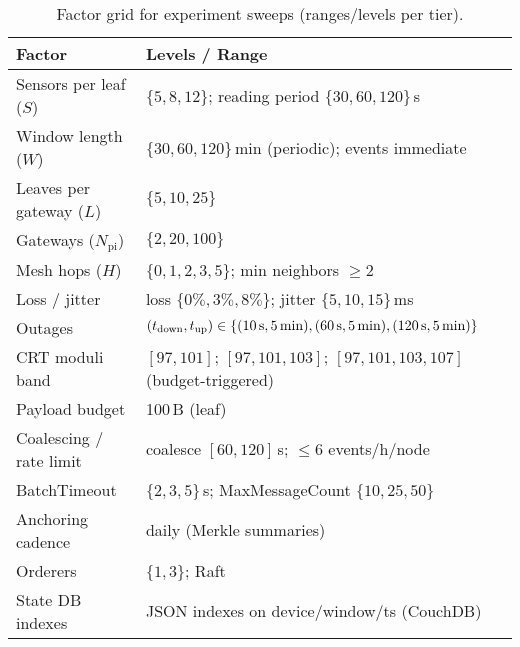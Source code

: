 \documentclass[12pt,onecolumn]{IEEEtran} %
\begin{document}
\begin{table}[htbp]
  \centering
  \caption{Factor grid for experiment sweeps (ranges/levels per tier).}
  \label{tab:factor-grid}
  \begin{tabular}{p{3.2cm} p{10.8cm}}
    \toprule
    \textbf{Factor} & \textbf{Levels / Range} \\
    \midrule
    Sensors per leaf ($S$) & $\{5,8,12\}$; reading period $\{30,60,120\}$\,s \\
    Window length ($W$) & $\{30,60,120\}$\,min (periodic); events immediate \\
    Leaves per gateway ($L$) & $\{5,10,25\}$ \\
    Gateways ($N_{\text{pi}}$) & $\{2,20,100\}$ \\
    Mesh hops ($H$) & $\{0,1,2,3,5\}$; min neighbors $\geq 2$ \\
    Loss / jitter & loss $\{0\%,3\%,8\%\}$; jitter $\{5,10,15\}$\,ms \\
    Outages & $(t_{\text{down}},t_{\text{up}})\in\{(10\text{\,s},5\text{\,min}),(60\text{\,s},5\text{\,min}),(120\text{\,s},5\text{\,min})\}$ \\
    CRT moduli band & $[97,101]$; $[97,101,103]$; $[97,101,103,107]$ (budget-triggered) \\
    Payload budget & 100\,B (leaf) \\
    Coalescing / rate limit & coalesce $[60,120]$\,s; $\leq6$ events/h/node \\
    BatchTimeout & $\{2,3,5\}$\,s; MaxMessageCount $\{10,25,50\}$ \\
    Anchoring cadence & daily (Merkle summaries) \\
    Orderers & $\{1,3\}$; Raft \\
    State DB indexes & JSON indexes on device/window/ts (CouchDB) \\
    \bottomrule
  \end{tabular}
\end{table}
\end{document}
